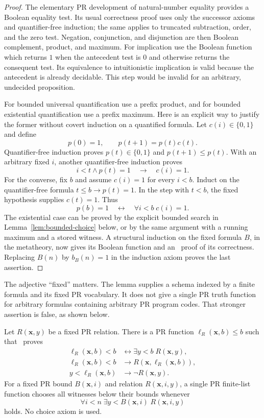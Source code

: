 \begin{proof}
The elementary PR development of natural-number equality provides a Boolean
equality test.  Its usual correctness proof uses only the successor axioms and
quantifier-free induction; the same applies to truncated subtraction, order,
and the zero test.  Negation, conjunction, and disjunction are then Boolean
complement, product, and maximum.  For implication use the Boolean function
which returns $1$ when the antecedent test is $0$ and otherwise returns the
consequent test.  Its equivalence to intuitionistic implication is valid
because the antecedent is already decidable.  This step would be invalid for
an arbitrary, undecided proposition.

For bounded universal quantification use a prefix product, and for bounded
existential quantification use a prefix maximum.  Here is an explicit way to
justify the former without covert induction on a quantified formula.  Let
$c(i)\in\{0,1\}$ and define
\[
 p(0)=1,\qquad p(t+1)=p(t)c(t).
\]
Quantifier-free induction proves $p(t)\in\{0,1\}$ and $p(t+1)\le p(t)$.
With an arbitrary fixed $i$, another quantifier-free induction proves
\[
 i<t\land p(t)=1\quad\longrightarrow\quad c(i)=1.
\]
For the converse, fix $b$ and assume $c(i)=1$ for every $i<b$.  Induct on the
quantifier-free formula $t\le b\to p(t)=1$.  In the step with $t<b$, the fixed
hypothesis supplies $c(t)=1$.  Thus
\[
 p(b)=1\quad\longleftrightarrow\quad\forall i<b\;c(i)=1.
\]
The existential case can be proved by the explicit bounded search in
Lemma~\ref{lem:bounded-choice} below, or by the same argument with a running
maximum and a stored witness.  A structural induction on the fixed formula
$B$, in the metatheory, now gives its Boolean function and an \ipra\ proof of
its correctness.  Replacing $B(n)$ by $b_B(n)=1$ in the induction axiom proves
the last assertion.
\end{proof}

The adjective ``fixed'' matters.  The lemma supplies a schema indexed by a
finite formula and its fixed PR vocabulary.  It does not give a single PR truth
function for arbitrary formulas containing arbitrary PR program codes.  That
stronger assertion is false, as shown below.

\begin{lemma}
\label{lem:bounded-choice}
Let $R(\boldsymbol x,y)$ be a fixed PR relation.  There is a PR function
$\ell_R(\boldsymbol x,b)\le b$ such that \ipra\ proves
\begin{align*}
 \ell_R(\boldsymbol x,b)<b
   &\longleftrightarrow \exists y<b\;R(\boldsymbol x,y),\\
 \ell_R(\boldsymbol x,b)<b
   &\longrightarrow R(\boldsymbol x,\ell_R(\boldsymbol x,b)),\\
 y<\ell_R(\boldsymbol x,b)
   &\longrightarrow \neg R(\boldsymbol x,y).
\end{align*}
For a fixed PR bound $B(\boldsymbol x,i)$ and relation
$R(\boldsymbol x,i,y)$, a single PR finite-list function chooses all witnesses
below their bounds whenever
\[
 \forall i<n\;\exists y<B(\boldsymbol x,i)\;R(\boldsymbol x,i,y)
\]
holds.  No choice axiom is used.
\end{lemma}

